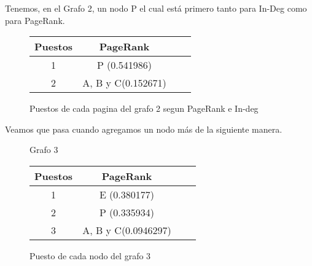 Tenemos, en el Grafo 2, un nodo P el cual está primero tanto para In-Deg como para PageRank.

\begin{figure}[H]
\centering
\begin{tabular}{| c | c | c | c |}
  \hline
  Puestos & PageRank\\ \hline \hline
  1 & P (0.541986)\\ \hline
  2 & A, B y C(0.152671)\\ \hline
\end{tabular}
  \caption{\footnotesize{Puestos de cada pagina del grafo 2 segun PageRank e In-deg}}
  \label{fig:Rankings}
\end{figure}

Veamos que pasa cuando agregamos un nodo más de la siguiente manera.

\begin{figure}[H]
\centering
{}
  \caption{\footnotesize{ Grafo 3 }}
  \label{fig:Rankings}
\end{figure}

\begin{figure}[H]
\centering
\begin{tabular}{| c | c | c | c |}
  \hline
  Puestos & PageRank\\ \hline \hline
  1 & E (0.380177)\\ \hline
  2 & P (0.335934)\\ \hline
  3 & A, B y C(0.0946297)\\ \hline
\end{tabular}
  \caption{\footnotesize{Puesto de cada nodo del grafo 3}}
  \label{fig:Rankings}
\end{figure}

